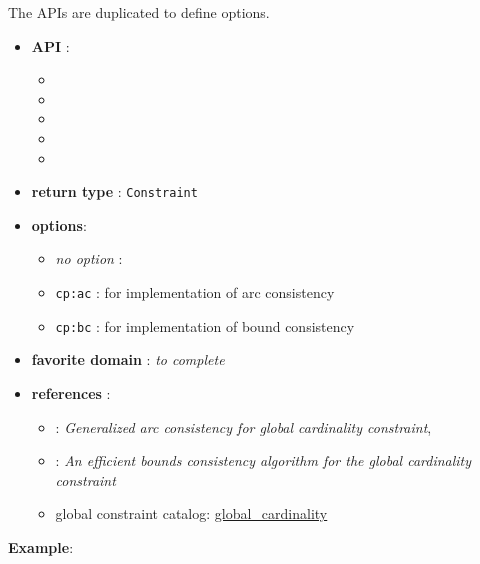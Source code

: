 The APIs are duplicated to define options. 

\begin{itemize}
	\item \textbf{API} :
      \begin{itemize}
	\item {}
	\item {}
	\item {}
	\item {}
	\item {}
      \end{itemize}
	\item \textbf{return type} : \texttt{Constraint}
	\item \textbf{options}:
	\begin{itemize}
		\item \emph{no option} :
		\item \texttt{cp:ac} : for \cite{ReginAAAI96} implementation of arc consistency
		\item \texttt{cp:bc} : for  \cite{QuimperCP03} implementation of bound consistency
	\end{itemize}
	\item \textbf{favorite domain} : \emph{to complete}
	\item \textbf{references} :
      \begin{itemize}
      \item \cite{ReginAAAI96}: \emph{Generalized arc consistency for global cardinality constraint},
      \item \cite{QuimperCP03}: \emph{An efficient bounds consistency algorithm for the global cardinality constraint}
      \item global constraint catalog: \href{http://www.emn.fr/x-info/sdemasse/gccat/Cglobal_cardinality.html}{global\_cardinality}
      \end{itemize}
\end{itemize}

\textbf{Example}:


